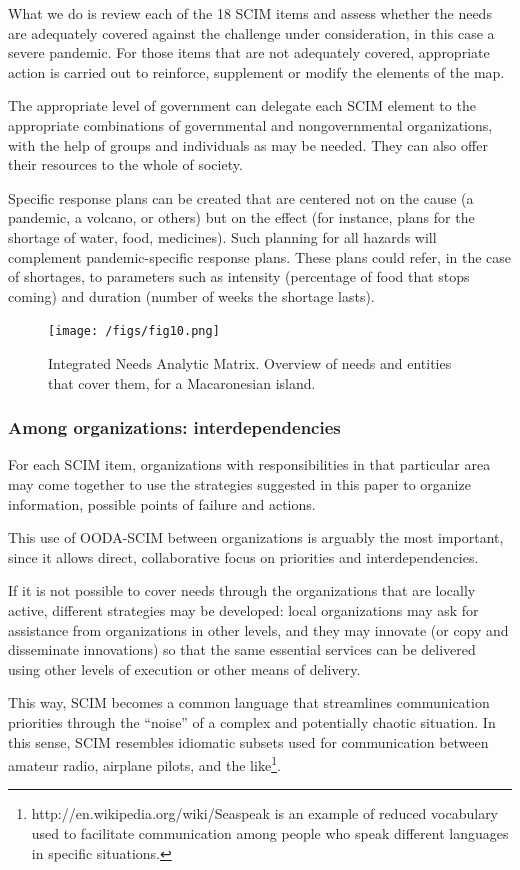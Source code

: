 \documentclass[12pt, a4]{scrartcl}
\begin{document}
What we do is review each of the 18 SCIM items and assess whether the needs are adequately covered against the challenge under consideration, in this case a severe pandemic. For those items that are not adequately covered, appropriate action is carried out to reinforce, supplement or modify the elements of the map.

The appropriate level of government can delegate each SCIM element to the appropriate combinations of governmental and nongovernmental organizations, with the help of groups and individuals as may be needed. They can also offer their resources to the whole of society.

Specific response plans can be created that are centered not on the cause (a pandemic, a volcano, or others) but on the effect (for instance, plans for the shortage of water, food, medicines). Such planning for all hazards will complement pandemic-specific response plans. These plans could refer, in the case of shortages, to parameters such as intensity (percentage of food that stops coming) and duration (number of weeks the shortage lasts).

\begin{figure}[h]
\centering
\texttt{[image: /figs/fig10.png]}
\caption{Integrated Needs Analytic Matrix. Overview of needs and entities that cover them, for a Macaronesian island.}
\end{figure}

\subsubsection{Among organizations: interdependencies}
For each SCIM item, organizations with responsibilities in that particular area may come together to use the strategies suggested in this paper to organize information, possible points of failure and actions.

This use of OODA-SCIM between organizations is arguably the most important, since it allows direct, collaborative focus on priorities and interdependencies.

If it is not possible to cover needs through the organizations that are locally active, different strategies may be developed: local organizations may ask for assistance from organizations in other levels, and they may innovate (or copy and disseminate innovations) so that the same essential services can be delivered using other levels of execution or other means of delivery.

This way, SCIM becomes a common language that streamlines communication priorities through the “noise” of a complex and potentially chaotic situation. In this sense, SCIM resembles idiomatic subsets used for communication between amateur radio, airplane pilots, and the like\footnote{http://en.wikipedia.org/wiki/Seaspeak is an example of reduced vocabulary used to facilitate communication among people who speak different languages in specific situations.}.
\newpage
\end{document}

